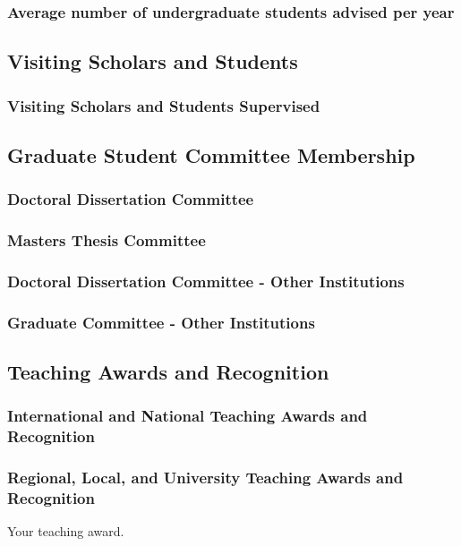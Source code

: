 \subsubsection{Average number of undergraduate students advised per year}

\subsection{Visiting Scholars and Students}
\subsubsection{Visiting Scholars and Students Supervised}

\subsection{Graduate Student Committee Membership}
\subsubsection{Doctoral Dissertation Committee}

\subsubsection{Masters Thesis Committee}

\subsubsection{Doctoral Dissertation Committee - Other Institutions}
\subsubsection{Graduate Committee - Other Institutions}


\subsection{Teaching Awards and Recognition}
\subsubsection{International and National Teaching Awards and Recognition}
\subsubsection{Regional, Local, and University Teaching Awards and Recognition}
\begin{outerenum}
  \item Your teaching award.
\end{outerenum}

